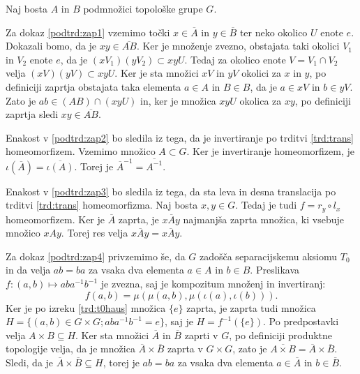 \documentclass[mat1]{fmfdelo}
\newcommand{\closure}[1]{\overline{#1}}
\begin{document}
\begin{dokaz}
	Naj bosta $A$ in $B$ podmnožici topološke grupe $G$.
	
	Za dokaz \ref{podtrd:zap1} vzemimo točki $x \in \closure{A}$ in $y \in \closure{B}$ ter neko okolico $U$ enote $e$. Dokazali bomo, da je $xy \in \closure{AB}$.
	Ker je množenje zvezno, obstajata taki okolici $V_1$ in $V_2$ enote $e$, da je $(xV_1)(yV_2) \subset xyU$. Tedaj za okolico enote $V = V_1 \cap V_2$ velja $(xV)(yV) \subset xyU$. Ker je sta množici $xV$ in $yV$ okolici za $x$ in $y$,
	po definiciji zaprtja obstajata taka elementa $a \in A$ in $B \in B$, da je $a \in xV$ in $b \in yV$. Zato je $ab \in (AB) \cap (xyU)$ in, ker je množica $xyU$ okolica za $xy$, po definiciji zaprtja sledi $xy \in \closure{AB}$.
	
	Enakost v \ref{podtrd:zap2} bo sledila iz tega, da je invertiranje po trditvi \ref{trd:trans} homeomorfizem. Vzemimo množico $A \subset G$. Ker je invertiranje homeomorfizem, je $\iota(\closure{A}) = \closure{\iota(A)}$. Torej je $\closure{A}^{-1} = \closure{A^{-1}}$.
	
	Enakost v \ref{podtrd:zap3} bo sledila iz tega, da sta leva in desna translacija po trditvi \ref{trd:trans} homeomorfizma. Naj bosta $x, y \in G$. Tedaj je tudi $f = r_y \circ l_x$ homeomorfizem. Ker je $\closure{A}$ zaprta, je $x\closure{A}y$ najmanjša zaprta množica, ki vsebuje množico $xAy$. Torej res velja $x\closure{A}y = \closure{xAy}$.
	
	Za dokaz \ref{podtrd:zap4} privzemimo še, da $G$ zadošča separacijskemu aksiomu $T_0$ in da velja $ab = ba$ za vsaka dva elementa $a \in A$ in $b \in B$. Preslikava $f\colon (a,b) \mapsto aba^{-1}b^{-1}$ je zvezna, saj je kompozitum množenj in invertiranj:
	\[ f(a, b) = \mu(\mu(a, b),\mu(\iota(a), \iota(b))). \]
	Ker je po izreku \ref{trd:t0haus} množica $\lbrace e \rbrace$ zaprta, je zaprta tudi množica $H = \lbrace (a, b) \in G \times G; aba^{-1}b^{-1} = e \rbrace$, saj je $H = f^{-1}(\lbrace e \rbrace)$. Po predpostavki velja $A \times B \subseteq H$.
	Ker sta množici $\closure{A}$ in $\closure{B}$ zaprti v $G$, po definiciji produktne topologije velja, da je množica $\closure{A} \times \closure{B}$ zaprta v $G \times G$, zato je $\closure{A \times B} = \closure{A} \times \closure{B}$. Sledi, da je $\closure{A} \times \closure{B} \subseteq H$, torej je $ab = ba$ za vsaka dva elementa $a \in \closure{A}$ in $b \in \closure{B}$.
\end{dokaz}
\end{document}
